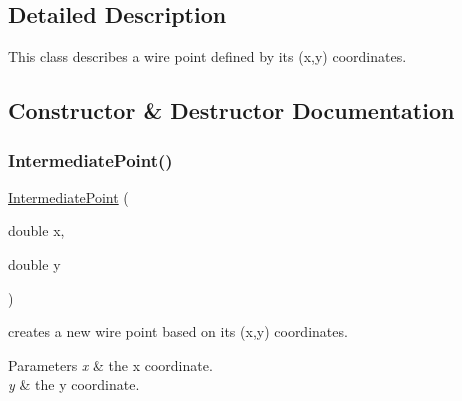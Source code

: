 \subsection{Detailed Description}
This class describes a wire point defined by its (x,y) coordinates. 

\subsection{Constructor \& Destructor Documentation}
\mbox{\label{class_open_chams_1_1_intermediate_point_ad8d801adfda3af856c5d1287c8bc0635}} 
\subsubsection{\texorpdfstring{Intermediate\+Point()}{IntermediatePoint()}}
{\footnotesize\ttfamily \hyperlink{class_open_chams_1_1_intermediate_point}{Intermediate\+Point} (\begin{DoxyParamCaption}\item[{double}]{x,  }\item[{double}]{y }\end{DoxyParamCaption})\hspace{0.3cm}{\ttfamily [inline]}}



creates a new wire point based on its (x,y) coordinates. 


\begin{DoxyParams}{Parameters}
{\em x} & the x coordinate. \\
\hline
{\em y} & the y coordinate. \\
\hline
\end{DoxyParams}
